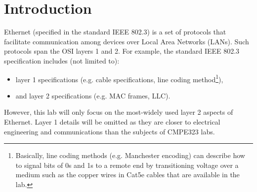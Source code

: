 \documentclass[pdftex,12pt,a4paper]{article}
\begin{document}
    \section{Introduction}
        Ethernet (specified in the standard IEEE 802.3) is a set of protocols
        that facilitate communication among devices over Local Area Networks
        (LANs).  Such protocols span the OSI layers 1 and 2. For example, the
        standard IEEE 802.3 specification includes (not limited to):
        \begin{itemize}
            \item layer 1 specifications (e.g. cable specifications, line
            coding method\footnote{Basically, line coding methods (e.g.
            Manchester encoding) can describe how to signal bits of 0s and 1s
            to a remote end by transitioning voltage over a medium such as the
            copper wires in Cat5e cables that are available in the lab.}),
            \item and layer 2 specifications (e.g. MAC frames, LLC).
        \end{itemize}
        
        However, this lab will only focus on the most-widely used layer 2
        aspects of Ethernet. Layer 1 details will be omitted as they are closer
        to electrical engineering and communications than the subjects of
        CMPE323 labs.
\end{document}
